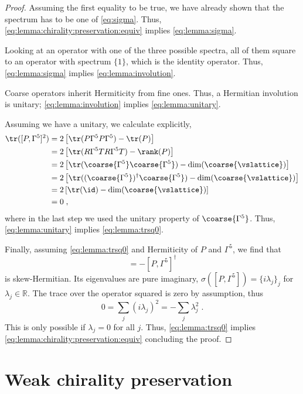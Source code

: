\begin{proof}
Assuming the first equality to be true, we have already shown that the spectrum has to be one of \cref{eq:sigma}.
Thus, \cref{eq:lemma:chirality:preservation:equiv} implies \cref{eq:lemma:sigma}.

Looking at an operator with one of the three possible spectra, all of them square to an operator with spectrum $\{1\}$, which is the identity operator.
Thus, \cref{eq:lemma:sigma} implies \cref{eq:lemma:involution}.

Coarse operators inherit Hermiticity from fine ones.
Thus, a Hermitian involution is unitary; \cref{eq:lemma:involution} implies \cref{eq:lemma:unitary}.

Assuming we have a unitary, we calculate explicitly,
\begin{align}
\tr([P, \Gamma^{5}]^{2})
&= 2 \left[ \tr(P \Gamma^{5} P \Gamma^{5})  - \tr(P) \right] \\
&= 2 \left[ \tr(R \Gamma^{5} T R \Gamma^{5} T)  - \rank(P) \right] \\
&= 2 \left[ \tr( \coarse{\Gamma^{5}} \coarse{\Gamma^{5}} )  - \dim(\coarse{\vslattice}) \right] \\
&= 2 \left[ \tr( (\coarse{\Gamma^{5}})^{\dagger} \coarse{\Gamma^{5}} )  - \dim(\coarse{\vslattice}) \right] \\
&= 2 \left[ \tr( \id )  - \dim(\coarse{\vslattice}) \right] \\
&= 0 \;,
\end{align}
where in the last step we used the unitary property of $\coarse{\Gamma^{5}}$.
Thus, \cref{eq:lemma:unitary} implies \cref{eq:lemma:trsq0}.

Finally, assuming \cref{eq:lemma:trsq0} and Hermiticity of $P$ and $\Gamma^{5}$, we find that
\begin{equation}
[P, \Gamma^{5}] = - [P, \Gamma^{5}]^{\dagger}
\end{equation}
is skew-Hermitian.
Its eigenvalues are pure imaginary, $\sigma([P, \Gamma^{5}]) = \{ i \lambda_j\}_j$ for $\lambda_j \in \mathbb{R}$.
The trace over the operator squared is zero by assumption, thus
\begin{equation}
0 = \sum_{j} (i \lambda_j)^2 = - \sum_{j} \lambda_j^2 \;.
\end{equation}
This is only possible if $\lambda_j=0$ for all $j$.
Thus, \cref{eq:lemma:trsq0} implies \cref{eq:lemma:chirality:preservation:equiv} concluding the proof.
\end{proof}

\section{Weak chirality preservation}
\label{sec:chirality:weak}


